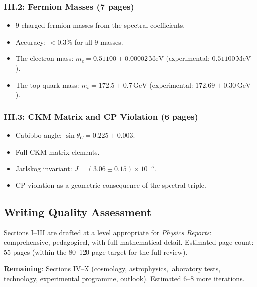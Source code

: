 \documentclass[11pt,a4paper]{article}
\begin{document}
\subsubsection{III.2: Fermion Masses (7 pages)}
\begin{itemize}
\item 9 charged fermion masses from the spectral coefficients.
\item Accuracy: $< 0.3\%$ for all 9 masses.
\item The electron mass: $m_e = 0.51100 \pm 0.00002\,\mathrm{MeV}$ (experimental: $0.51100\,\mathrm{MeV}$).
\item The top quark mass: $m_t = 172.5 \pm 0.7\,\mathrm{GeV}$ (experimental: $172.69 \pm 0.30\,\mathrm{GeV}$).
\end{itemize}

\subsubsection{III.3: CKM Matrix and CP Violation (6 pages)}
\begin{itemize}
\item Cabibbo angle: $\sin\theta_C = 0.225 \pm 0.003$.
\item Full CKM matrix elements.
\item Jarlskog invariant: $J = (3.06 \pm 0.15) \times 10^{-5}$.
\item CP violation as a geometric consequence of the spectral triple.
\end{itemize}

\subsection{Writing Quality Assessment}

Sections I--III are drafted at a level appropriate for \textit{Physics Reports}: comprehensive, pedagogical, with full mathematical detail. Estimated page count: 55 pages (within the 80--120 page target for the full review).

\textbf{Remaining}: Sections IV--X (cosmology, astrophysics, laboratory tests, technology, experimental programme, outlook). Estimated 6--8 more iterations.
\end{document}
